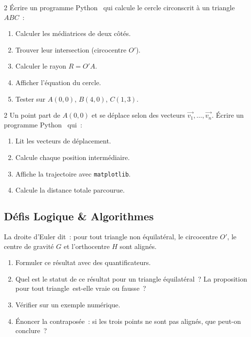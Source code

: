 \begin{bilan}
\begin{probleme}{2}
\'Ecrire un programme Python \computer\ qui calcule le cercle circonscrit
\`a un triangle $ABC$~:
\begin{enumerate}
  \item Calculer les m\'ediatrices de deux c\^ot\'es.
  \item Trouver leur intersection (circocentre $O'$).
  \item Calculer le rayon $R=O'A$.
  \item Afficher l'\'equation du cercle.
  \item Tester sur $A(0,0)$, $B(4,0)$, $C(1,3)$.
\end{enumerate}
\end{probleme}

\begin{probleme}{2}
Un point part de $A(0,0)$ et se d\'eplace selon des vecteurs $\vec{v_1},\ldots,\vec{v_n}$.
\'Ecrire un programme Python \computer\ qui~:
\begin{enumerate}
  \item Lit les vecteurs de d\'eplacement.
  \item Calcule chaque position interm\'ediaire.
  \item Affiche la trajectoire avec \texttt{matplotlib}.
  \item Calcule la distance totale parcourue.
\end{enumerate}
\end{probleme}

\subsection*{D\'efis Logique \& Algorithmes}

\begin{challenge}
La droite d'Euler dit~: pour tout triangle non \'equilat\'eral,
le circocentre $O'$, le centre de gravité $G$ et l'orthocentre $H$ sont align\'es.
\begin{enumerate}
  \item Formuler ce r\'esultat avec des quantificateurs.
  \item Quel est le statut de ce r\'esultat pour un triangle \'equilat\'eral~?
        La proposition \og pour tout triangle\fg\ est-elle vraie ou fausse~?
  \item V\'erifier sur un exemple num\'erique.
  \item \'Enoncer la contrapos\'ee~: si les trois points ne sont pas align\'es,
        que peut-on conclure~?
\end{enumerate}
\end{challenge}


\end{bilan}
